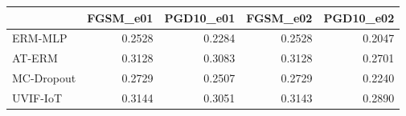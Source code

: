 \begin{tabular}{lrrrr}
\toprule
 & FGSM_e01 & PGD10_e01 & FGSM_e02 & PGD10_e02 \\
\midrule
ERM-MLP & 0.2528 & 0.2284 & 0.2528 & 0.2047 \\
AT-ERM & 0.3128 & 0.3083 & 0.3128 & 0.2701 \\
MC-Dropout & 0.2729 & 0.2507 & 0.2729 & 0.2240 \\
UVIF-IoT & 0.3144 & 0.3051 & 0.3143 & 0.2890 \\
\bottomrule
\end{tabular}
